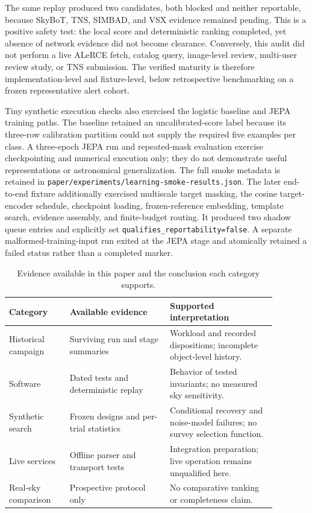 \documentclass[11pt]{article}
\begin{document}
The same replay produced two candidates, both blocked and neither reportable, because SkyBoT, TNS, SIMBAD, and VSX evidence remained pending. This is a positive safety test: the local score and deterministic ranking completed, yet absence of network evidence did not become clearance. Conversely, this audit did not perform a live ALeRCE fetch, catalog query, image-level review, multi-user review study, or TNS submission. The verified maturity is therefore implementation-level and fixture-level, below retrospective benchmarking on a frozen representative alert cohort.

Tiny synthetic execution checks also exercised the logistic baseline and JEPA training paths. The baseline retained an uncalibrated-score label because its three-row calibration partition could not supply the required five examples per class. A three-epoch JEPA run and repeated-mask evaluation exercise checkpointing and numerical execution only; they do not demonstrate useful representations or astronomical generalization. The full smoke metadata is retained in \texttt{paper/experiments/learning-smoke-results.json}. The later end-to-end fixture additionally exercised multiscale target masking, the cosine target-encoder schedule, checkpoint loading, frozen-reference embedding, template search, evidence assembly, and finite-budget routing. It produced two shadow queue entries and explicitly set \texttt{qualifies\_reportability=false}. A separate malformed-training-input run exited at the JEPA stage and atomically retained a failed status rather than a completed marker.

\begin{table}[ht]
\centering
\caption{Evidence available in this paper and the conclusion each category supports.}
\label{tab:evidence-scope}
\begin{tabular}{p{0.20\linewidth}p{0.33\linewidth}p{0.35\linewidth}}
\toprule
Category & Available evidence & Supported interpretation \\
\midrule
Historical campaign & Surviving run and stage summaries & Workload and recorded dispositions; incomplete object-level history. \\
Software & Dated tests and deterministic replay & Behavior of tested invariants; no measured sky sensitivity. \\
Synthetic search & Frozen designs and per-trial statistics & Conditional recovery and noise-model failures; no survey selection function. \\
Live services & Offline parser and transport tests & Integration preparation; live operation remains unqualified here. \\
Real-sky comparison & Prospective protocol only & No comparative ranking or completeness claim. \\
\bottomrule
\end{tabular}
\end{table}
\end{document}
